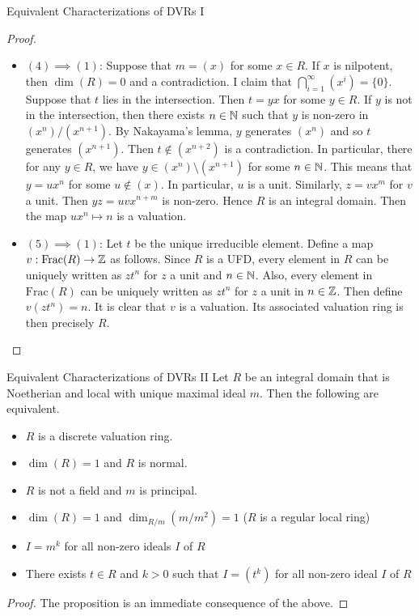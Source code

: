 \documentclass[a4paper]{article}
\begin{document}
\begin{prp}{Equivalent Characterizations of DVRs I}{}
\begin{proof}
\begin{itemize}
Thus $m$ is a PID. 
\item $(4)\implies(1)$: Suppose that $m=(x)$ for some $x\in R$. If $x$ is nilpotent, then $\dim(R)=0$ and a contradiction. I claim that $\bigcap_{i=1}^\infty(x^i)=\{0\}$. Suppose that $t$ lies in the intersection. Then $t=yx$ for some $y\in R$. If $y$ is not in the intersection, then there exists $n\in\mathbb{N}$ such that $y$ is non-zero in $(x^n)/(x^{n+1})$. By Nakayama's lemma, $y$ generates $(x^n)$ and so $t$ generates $(x^{n+1})$. Then $t\notin(x^{n+2})$ is a contradiction. In particular, there for any $y\in R$, we have $y\in(x^n)\setminus(x^{n+1})$ for some $n\in\mathbb{N}$. This means that $y=ux^n$ for some $u\notin(x)$. In particular, $u$ is a unit. Similarly, $z=vx^m$ for $v$ a unit. Then $yz=uvx^{n+m}$ is non-zero. Hence $R$ is an integral domain. Then the map $ux^n\mapsto n$ is a valuation. 
\item $(5)\implies(1)$: Let $t$ be the unique irreducible element. Define a map $v:\text{Frac}(R)\to\mathbb{Z}$ as follows. Since $R$ is a UFD, every element in $R$ can be uniquely written as $zt^n$ for $z$ a unit and $n\in\mathbb{N}$. Also, every element in $\text{Frac}(R)$ can be uniquely written as $zt^n$ for $z$ a unit in $n\in\mathbb{Z}$. Then define $v(zt^n)=n$. It is clear that $v$ is a valuation. Its associated valuation ring is then precisely $R$. 
\end{itemize}
\end{proof}
\end{prp}

\begin{prp}{Equivalent Characterizations of DVRs II}{} Let $R$ be an integral domain that is Noetherian and local with unique maximal ideal $m$. Then the following are equivalent. 
\begin{itemize}
\item $R$ is a discrete valuation ring. 
\item $\dim(R)=1$ and $R$ is normal. 
\item $R$ is not a field and $m$ is principal. 
\item $\dim(R)=1$ and $\dim_{R/m}(m/m^2)=1$ ($R$ is a regular local ring)
\item $I=m^k$ for all non-zero ideals $I$ of $R$
\item There exists $t\in R$ and $k>0$ such that $I=(t^k)$ for all non-zero ideal $I$ of $R$
\end{itemize} 
\begin{proof}
The proposition is an immediate consequence of the above. 
\end{proof}
\end{prp}
\end{document}
